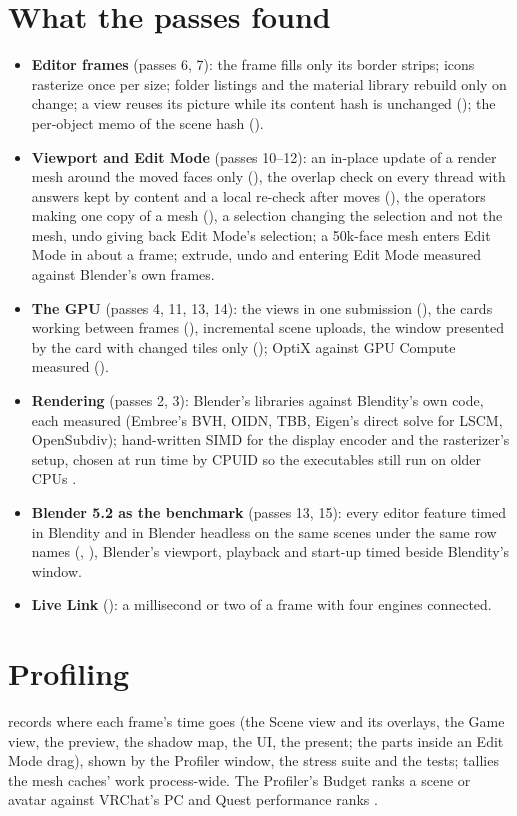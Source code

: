 \section{What the passes found}
\begin{itemize}
  \item \textbf{Editor frames} (passes 6, 7): the frame fills only its border strips; icons rasterize once per size;
    folder listings and the material library rebuild only on change; a view reuses its picture while its content hash
    is unchanged (); the per-object memo of the scene hash ().
  \item \textbf{Viewport and Edit Mode} (passes 10--12): an in-place update of a render mesh around the moved faces
    only (), the overlap check on every thread with answers kept by content and a local re-check after moves
    (), the operators making one copy of a mesh (), a selection changing the selection and not the
    mesh, undo giving back Edit Mode's selection; a 50k-face mesh enters Edit Mode in about a frame; extrude, undo and
    entering Edit Mode measured against Blender's own frames.
  \item \textbf{The GPU} (passes 4, 11, 13, 14): the views in one submission (), the cards working between
    frames (), incremental scene uploads, the window presented by the card with changed tiles only
    (); OptiX against GPU Compute measured ().
  \item \textbf{Rendering} (passes 2, 3): Blender's libraries against Blendity's own code, each measured (Embree's
    BVH, OIDN, TBB, Eigen's direct solve for LSCM, OpenSubdiv); hand-written SIMD for the display encoder and the
    rasterizer's setup, chosen at run time by CPUID so the executables still run on older CPUs
    \cite{Gregory2018vol1}.
  \item \textbf{Blender 5.2 as the benchmark} (passes 13, 15): every editor feature timed in Blendity and in Blender
    headless on the same scenes under the same row names (, ),
    Blender's viewport, playback and start-up timed beside Blendity's window.
  \item \textbf{Live Link} (): a millisecond or two of a frame with four engines connected.
\end{itemize}

\section{Profiling}
 records where each frame's time goes (the Scene view and its overlays, the Game view, the preview,
the shadow map, the UI, the present; the parts inside an Edit Mode drag), shown by the Profiler window, the stress
suite and the tests;  tallies the mesh caches' work process-wide. The Profiler's Budget ranks a scene
or avatar against VRChat's PC and Quest performance ranks \cite{VRChatCreators2026}.

